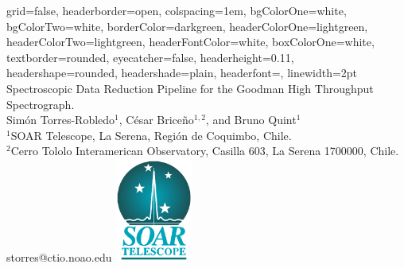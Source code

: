 \documentclass[a0paper,portrait]{baposter}
\begin{document}

\begin{poster}
{
grid=false,
headerborder=open, %
colspacing=1em, %
bgColorOne=white, %
bgColorTwo=white, %
borderColor=darkgreen, %
headerColorOne=lightgreen, %
headerColorTwo=lightgreen, %
headerFontColor=white, %
boxColorOne=white, %
textborder=rounded, %
eyecatcher=false, %
headerheight=0.11\textheight, %
headershape=rounded, %
headershade=plain,
headerfont=\Large\textsf, %
linewidth=2pt %
}
{}
%
%
{
\textsf %
{Spectroscopic Data Reduction Pipeline for the Goodman High Throughput Spectrograph.
}
} %
{\sf\vspace{0.1em}\\
Sim\'on Torres-Robledo$^1$, C\'esar Brice\~no$^{1,2}$, and Bruno Quint$^1$
\vspace{0.1em}\\
\small{$^1$SOAR Telescope, La Serena, Regi\'on de Coquimbo, Chile.\\
$^2$Cerro Tololo Interamerican Observatory, Casilla 603, La Serena 1700000, Chile.
\vspace{0.2em}\\
storres@ctio.noao.edu}
}
{\includegraphics[width=97px]{logo.eps}} %



\end{poster}
\end{document}
